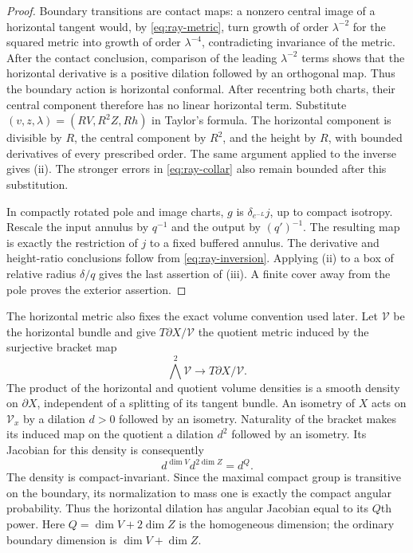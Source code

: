 \begin{proof}
Boundary transitions are contact maps: a nonzero central image of a
horizontal tangent would, by \eqref{eq:ray-metric}, turn growth
of order \(\lambda^{-2}\) for the squared metric into growth of order
\(\lambda^{-4}\), contradicting invariance of the metric.  After
the contact conclusion, comparison of the leading
\(\lambda^{-2}\) terms shows that the horizontal derivative is a
positive dilation followed by an orthogonal map.  Thus the boundary
action is horizontal conformal.  After
recentring both charts, their central component therefore has no linear
horizontal term.  Substitute \((v,z,\lambda)=(RV,R^2Z,Rh)\) in Taylor's
formula.  The horizontal component is divisible by \(R\), the central
component by \(R^2\), and the height by \(R\), with bounded derivatives
of every prescribed order.  The same argument applied to the inverse
gives (ii).  The stronger errors in \eqref{eq:ray-collar} also
remain bounded after this substitution.

In compactly rotated pole and image charts, \(g\) is
\(\delta_{e^{-L}}j\), up to compact isotropy.  Rescale the input annulus
by \(q^{-1}\) and the output by \((q')^{-1}\).  The resulting map is
exactly the restriction of \(j\) to a fixed buffered annulus.
The derivative and height-ratio conclusions follow from
\eqref{eq:ray-inversion}.  Applying (ii) to a box of relative
radius \(\delta/q\) gives the last assertion of (iii).  A finite cover
away from the pole proves the exterior assertion.
\end{proof}

The horizontal metric also fixes the exact volume convention used
later. Let \(\mathcal V\) be the horizontal bundle and give
\(T\partial X/\mathcal V\) the quotient metric induced by the surjective
bracket map
\[
 \bigwedge^2\mathcal V\longrightarrow T\partial X/\mathcal V.
\]
The product of the horizontal and quotient volume densities is a smooth
density on \(\partial X\), independent of a splitting of its tangent
bundle. An isometry of \(X\) acts on \(\mathcal V_x\) by a dilation
\(d>0\) followed by an isometry. Naturality of the bracket makes its
induced map on the quotient a dilation \(d^2\) followed by an isometry.
Its Jacobian for this density is consequently
\[
 d^{\dim V}d^{2\dim Z}=d^Q.
\]
The density is compact-invariant. Since the maximal compact group is
transitive on the boundary, its normalization to mass one is exactly
the compact angular probability. Thus the horizontal dilation has
angular Jacobian equal to its \(Q\)th power. Here \(Q=\dim V+2\dim Z\)
is the homogeneous dimension; the ordinary boundary dimension is
\(\dim V+\dim Z\).

